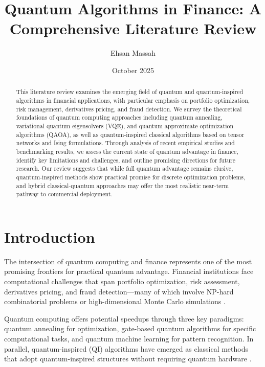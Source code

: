\documentclass[12pt]{article}
\title{\textbf{Quantum Algorithms in Finance: A Comprehensive Literature Review}}
\author{Ehsan Massah}
\date{October 2025}
\numberwithin{equation}{section}
\begin{document}
\maketitle

\begin{abstract}
This literature review examines the emerging field of quantum and quantum-inspired algorithms in financial applications, with particular emphasis on portfolio optimization, risk management, derivatives pricing, and fraud detection. We survey the theoretical foundations of quantum computing approaches including quantum annealing, variational quantum eigensolvers (VQE), and quantum approximate optimization algorithms (QAOA), as well as quantum-inspired classical algorithms based on tensor networks and Ising formulations. Through analysis of recent empirical studies and benchmarking results, we assess the current state of quantum advantage in finance, identify key limitations and challenges, and outline promising directions for future research. Our review suggests that while full quantum advantage remains elusive, quantum-inspired methods show practical promise for discrete optimization problems, and hybrid classical-quantum approaches may offer the most realistic near-term pathway to commercial deployment.
\end{abstract}

\newpage
\tableofcontents
\newpage

\section{Introduction}

The intersection of quantum computing and finance represents one of the most promising frontiers for practical quantum advantage. Financial institutions face computational challenges that span portfolio optimization, risk assessment, derivatives pricing, and fraud detection—many of which involve NP-hard combinatorial problems or high-dimensional Monte Carlo simulations \citep{Rebentrost2018QuantumFinance, Egger2020QuantumFinance}.

Quantum computing offers potential speedups through three key paradigms: quantum annealing for optimization, gate-based quantum algorithms for specific computational tasks, and quantum machine learning for pattern recognition. In parallel, quantum-inspired (QI) algorithms have emerged as classical methods that adopt quantum-inspired structures without requiring quantum hardware \citep{Orus2019, Arrazola2019QI}.
\end{document}
